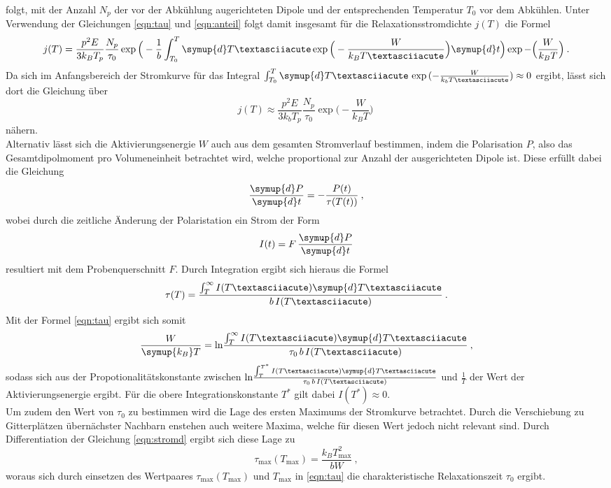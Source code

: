 folgt, mit der Anzahl $N_p$ der vor der Abkühlung augerichteten Dipole
und der entsprechenden Temperatur $T_0$ vor dem Abkühlen. Unter Verwendung
der Gleichungen \eqref{eqn:tau} und \eqref{eqn:anteil} folgt damit insgesamt für die
Relaxationsstromdichte $j(T)$ die Formel
\begin{equation}
  j(T)=\frac{p^2E}{3k_BT_p}\frac{N_p}{\tau_0}  \exp{\Big(-\frac{1}{b}\int_{T_0}^{T}
  \symup{d}T´\exp{\Big(-\frac{W}{k_BT´}\Big)}{\symup{d}t}\Big)}
  \exp{-\Big(\frac{W}{k_BT}\Big)} \:.
  \label{eqn:stromd}
\end{equation}
Da sich im Anfangsbereich der Stromkurve für das Integral $\int_{T_0}^{T} \symup{d}T´\,\exp{(-\frac{W}{k_bT´})} \approx 0$
ergibt, lässt sich dort die Gleichung über
\begin{equation}
  j(T)\approx \frac{p^2E}{3k_bT_p}\frac{N_p}{\tau_0} \exp{\Big(-\frac{W}{k_BT}\Big)} \:
  \label{eqn:stromnäherung}
\end{equation}
nähern. \\
Alternativ lässt sich die Aktivierungsenergie $W$ auch aus dem gesamten Stromverlauf bestimmen,
indem die Polarisation $P$, also das Gesamtdipolmoment pro Volumeneinheit betrachtet wird, welche
proportional zur Anzahl der ausgerichteten Dipole ist. Diese erfüllt dabei die Gleichung
\begin{equation}
  \frac{\symup{d}P}{\symup{d}t}=-\frac{P(t)}{\tau(T(t))} \: ,
  \label{eqn:PolDGL}
\end{equation}
wobei durch die zeitliche Änderung der Polaristation ein Strom der Form
\begin{equation}
  I(t)=F\, \frac{\symup{d}P}{\symup{d}t}
\end{equation}
resultiert mit dem Probenquerschnitt $F$. Durch Integration ergibt sich hieraus die Formel
\begin{equation}
  \tau(T)=\frac{\int_T^\infty I(T´)\symup{d}T´}{b\,I(T´)} \: .
\end{equation}
Mit der Formel \eqref{eqn:tau} ergibt sich somit
\begin{equation}
  \frac{W}{\symup{k_B}T}=\text{ln}\frac{\int_T^\infty I(T´)\symup{d}T´}{\tau_0\,b\,I(T´)} \: ,
  \label{eqn:integral}
\end{equation}
sodass sich aus der Propotionalitätskonstante zwischen $\text{ln}\frac{\int_T^{T^*} I(T´)\symup{d}T´}{\tau_0\,b\,I(T´)}$
und $\frac{1}{T}$ der Wert der Aktivierungsenergie ergibt. Für die obere Integrationskonstante $T^*$
gilt dabei $I(T^*)\approx0$. \\
Um zudem den Wert von $\tau_0$ zu bestimmen wird die Lage des ersten Maximums der Stromkurve betrachtet.
Durch die Verschiebung zu Gitterplätzen übernächster Nachbarn enstehen auch weitere Maxima,
welche für diesen Wert jedoch nicht relevant sind. Durch Differentiation der
Gleichung \eqref{eqn:stromd} ergibt sich diese Lage
zu
\begin{equation}
  \tau_{\text{max}}(T_{\text{max}})=\frac{k_BT^2_{\text{max}}}{bW} \: ,
  \label{eqn:taumax}
\end{equation}
woraus sich durch einsetzen des Wertpaares $\tau_{\text{max}}(T_{\text{max}})$ und
$T_{\text{max}}$ in \eqref{eqn:tau} die charakteristische Relaxationszeit $\tau_0$ ergibt.
